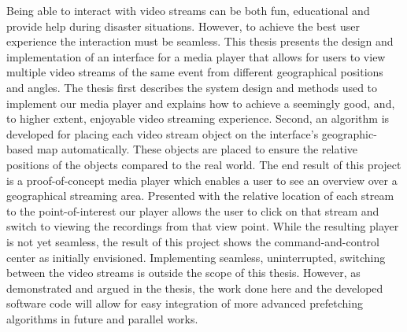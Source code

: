 Being able to interact with video streams can be both fun, educational and provide help during disaster situations. However, to achieve the best user experience the interaction must be seamless. This thesis presents the design and implementation of an interface for a media player that allows for users to view multiple video streams of the same event from different geographical positions and angles. The thesis first describes the system design and methods used to implement our media player and explains how to achieve a seemingly good, and, to higher extent, enjoyable video streaming experience. Second, an algorithm is developed for placing each video stream object on the interface's geographic-based map automatically. These objects are placed to ensure the relative positions of the objects compared to the real world. The end result of this project is a proof-of-concept media player which enables a user to see an overview over a geographical streaming area. Presented with the relative location of each stream to the point-of-interest our player allows the user to click on that stream and switch to viewing the recordings from that view point. While the resulting player is not yet seamless, the result of this project shows the command-and-control center as initially envisioned. Implementing seamless, uninterrupted, switching between the video streams is outside the scope of this thesis. However, as demonstrated and argued in the thesis, the work done here and the developed software code will allow for easy integration of more advanced prefetching algorithms in future and parallel works.